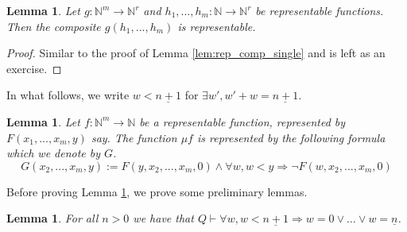 \documentclass[12pt]{article}
\theoremstyle{plain}
\newtheorem{lemma}[thm]{Lemma}
\theoremstyle{definition}
\newcommand{\bb}[1]{\mathbb{#1}}
\newcommand{\lto}{\longrightarrow}
\begin{document}
	\begin{lemma}\label{lem:rep_comp_multi}
		Let $g: \bb{N}^m \lto \bb{N}^r$ and $h_1,...,h_m: \bb{N} \lto \bb{N}^r$ be representable functions. Then the composite $g(h_1,...,h_m)$ is representable.
	\end{lemma}
	\begin{proof}
		Similar to the proof of Lemma \ref{lem:rep_comp_single} and is left as an exercise. 
	\end{proof}
	In what follows, we write $w < \underline{n + 1}$ for $\exists w', w' + w = \underline{n+1}$.
	\begin{lemma}\label{lem:minimisation_rep}
		Let $f: \bb{N}^m \lto \bb{N}$ be a representable function, represented by $F(x_1,...,x_m,y)$ say. The function $\mu f$ is represented by the following formula which we denote by $G$.
		\begin{equation}
			G(x_2,...,x_m,y) := F(y,x_2,...,x_m,0) \wedge \forall w, w < y \Longrightarrow \neg F(w,x_2,...,x_m,0)
		\end{equation}
	\end{lemma}
	Before proving Lemma \ref{lem:minimisation_rep}, we prove some preliminary lemmas.
	\begin{lemma}\label{lem:numbers_less}
		For all $n >0$ we have that $Q \vdash \forall w, w < \underline{n+1} \Longrightarrow w = 0 \vee \hdots \vee w = \underline{n}$.
	\end{lemma}
\end{document}
